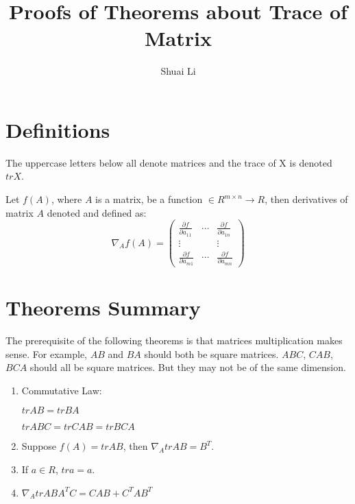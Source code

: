 \documentclass[a4paper]{article}
\title{Proofs of Theorems about Trace of Matrix}
\author{Shuai Li}
\newenvironment{definition}[1][Definition]{\begin{trivlist}
\item[\hskip \labelsep {\bfseries #1}]}{\end{trivlist}}
\begin{document}
\maketitle
\tableofcontents
\pagebreak

\section{Definitions}

\begin{definition}
  The uppercase letters below all denote matrices and the trace of X is
  denoted $trX$.
\end{definition}

\begin{definition}
	Let $f(A)$, where $A$ is a matrix, be a function $\in R^{m\times n} \to
	R $, then derivatives of matrix $A$ denoted and defined as:
	\begin{displaymath}
		\nabla_Af(A) =
		\begin{pmatrix}
			\frac{\partial f}{\partial a_{11}} & \cdots & \frac{\partial f}{\partial a_{1n}}\\
			\vdots &  & \vdots\\
			\frac{\partial f}{\partial a_{m1}} & \cdots & \frac{\partial f}{\partial a_{mn}}
		\end{pmatrix}
\end{displaymath}

\end{definition}

\section{Theorems Summary}

The prerequisite of the following theorems is that matrices
multiplication makes sense. For example, $AB$ and $BA$ should both be
square matrices. $ABC$, $CAB$, $BCA$ should all be square matrices. But
they may not be of the same dimension.

\begin{enumerate}
	\item Commutative Law:

		$trAB = trBA$  

		$trABC = trCAB = trBCA$
	\item Suppose $f(A) = trAB$, then $\nabla_A trAB = B^T$.
	\item If $a \in R$, $tra = a$.
	\item $\nabla_A trABA^TC = CAB + C^TAB^T$
\end{enumerate}
\end{document}
